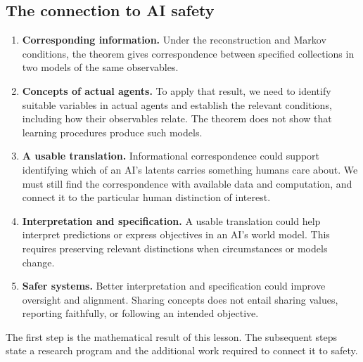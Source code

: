 \documentclass[11pt]{article}
\begin{document}
\subsection{The connection to AI safety}
\label{sec:context-safety}
\begin{enumerate}
\item \textbf{Corresponding information.} Under the reconstruction and Markov
conditions, the theorem gives correspondence between specified collections in
two models of the same observables.
\item \textbf{Concepts of actual agents.} To apply that result, we need to
identify suitable variables in actual agents and establish the relevant
conditions, including how their observables relate. The theorem does not show
that learning procedures produce such models.
\item \textbf{A usable translation.} Informational correspondence could support
identifying which of an AI's latents carries something humans care about. We
must still find
the correspondence with available data and computation, and connect it to the
particular human distinction of interest.
\item \textbf{Interpretation and specification.} A usable translation could help
interpret predictions or express objectives in an AI's world model. This requires
preserving relevant distinctions when circumstances or models change.
\item \textbf{Safer systems.} Better interpretation and specification could improve
oversight and alignment. Sharing concepts does not entail sharing values,
reporting faithfully, or following an intended objective.
\end{enumerate}
The first step is the mathematical result of this lesson. The subsequent steps
state a research program and the additional work required to connect it to
safety.
\end{document}
